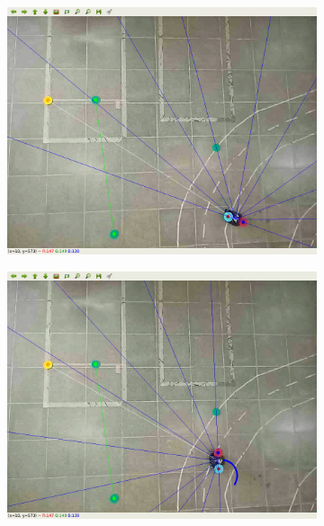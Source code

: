 \begin{figure}[htbp]
    \centering
    \begin{subfigure}[b]{0.115\textwidth}
        \includegraphics[width=\textwidth]{images/test_env1/1.png}
    \end{subfigure}
    \hfill
    \begin{subfigure}[b]{0.115\textwidth}
        \includegraphics[width=\textwidth]{images/test_env1/2.png}
    \end{subfigure}
    \hfill
    \begin{subfigure}[b]{0.115\textwidth}

\end{subfigure}
\end{figure}
